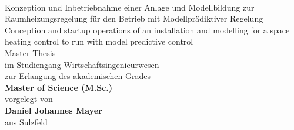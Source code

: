 %
%

\begin{titlepage}
   \mbox{}\\
   \rmfamily\huge
   \centering
	\rmfamily\mdseries\huge{Konzeption und Inbetriebnahme einer Anlage und Modellbildung zur Raumheizungsregelung für den Betrieb mit Modellprädiktiver Regelung}
   \vspace{1\baselineskip}\\
	\rmfamily\mdseries\upshape\normalsize{Conception and startup operations of an installation and modelling for a space heating control to run with model predictive control}
  \vspace{3\baselineskip}\\
   \rmfamily\mdseries\upshape\normalsize{
 Master-Thesis\\
im Studiengang Wirtschaftsingenieurwesen} 
  \vspace{2\baselineskip}\\
  \rmfamily\mdseries\upshape\normalsize{	
zur Erlangung des akademischen Grades\\
\textsf{\textbf{Master of Science (M.Sc.)}}}\\
   \vspace{3\baselineskip}
   \rmfamily\mdseries\upshape\normalsize{
   vorgelegt von\\
   \textsf{\textbf{Daniel Johannes Mayer}}\\
   aus Sulzfeld}
   \vspace{3\baselineskip}\\
\flushleft
\rmfamily\mdseries{}
   \vspace{3\baselineskip}\\
\centering\   \rmfamily\mdseries{}	   
\end{titlepage}


